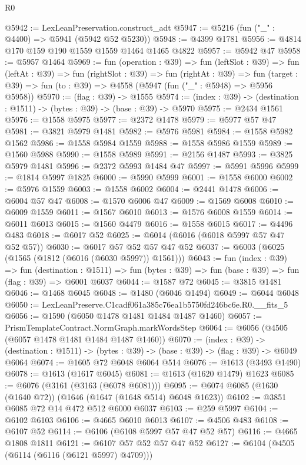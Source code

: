 \begin{lexlean}{R0}
\begin{coremodule}
@5942 := LexLeanPreservation.construct_adt
@5947 := @5216 (fun ("_" : @4400) => @5941 (@5942 @52 @5230))
@5948 := @4399 @1781
@5956 := @4814 @170 @159 @190 @1559 @1559 @1464 @1465 @4822
@5957 := @5942 @47
@5958 := @5957 @1464
@5969 := fun (operation : @39) =>
  fun (leftSlot : @39) =>
  fun (leftAt : @39) =>
  fun (rightSlot : @39) =>
  fun (rightAt : @39) =>
  fun (target : @39) => fun (to : @39) => @4558 (@5947 (fun ("_" : @5948) => @5956 @5958))
@5970 := (flag : @39) -> @1555
@5974 := (index : @39) -> (destination : @1511) -> (bytes : @39) -> (base : @39) -> @5970
@5975 := @2434 @1561
@5976 := @1558 @5975
@5977 := @2372 @1478
@5979 := @5977 @57 @47
@5981 := @3821 @5979 @1481
@5982 := @5976 @5981
@5984 := @1558 @5982 @1562
@5986 := @1558 @5984 @1559
@5988 := @1558 @5986 @1559
@5989 := @1560 @5988
@5990 := @1558 @5989
@5991 := @2156 @1487
@5993 := @3825 @5979 @1481
@5996 := @2372 @5993 @1484 @47
@5997 := @5991 @5996
@5999 := @1814 @5997 @1825
@6000 := @5990 @5999
@6001 := @1558 @6000
@6002 := @5976 @1559
@6003 := @1558 @6002
@6004 := @2441 @1478
@6006 := @6004 @57 @47
@6008 := @1570 @6006 @47
@6009 := @1569 @6008
@6010 := @6009 @1559
@6011 := @1567 @6010
@6013 := @1576 @6008 @1559
@6014 := @6011 @6013
@6015 := @1560 @4479
@6016 := @1558 @6015
@6017 := @4496 @483
@6018 := @6017 @52
@6025 := @6014 (@6016 (@6018 @5997 @57 @47 @52 @57))
@6030 := @6017 @57 @52 @57 @47 @52
@6037 := @6003 (@6025 (@1565 (@1812 (@6016 (@6030 @5997)) @1561)))
@6043 := fun (index : @39) =>
  fun (destination : @1511) =>
  fun (bytes : @39) => fun (base : @39) => fun (flag : @39) => @6001 @6037
@6044 := @1587 @72
@6045 := @3815 @1481
@6046 := @1468 @6045
@6048 := @1480 (@6046 @1494)
@6049 := @6044 @6048
@6050 := LexLeanPreserve.C1cadf061a385c76ea1b5750fd246bc6e.R0.__fits_5
@6056 := @1590 (@6050 @1478 @1481 @1484 @1487 @1460)
@6057 := PrismTemplateContract.NormGraph.markWordsStep
@6064 := @6056 (@4505 (@6057 @1478 @1481 @1484 @1487 @1460))
@6070 := (index : @39) ->
  (destination : @1511) -> (bytes : @39) -> (base : @39) -> (flag : @39) -> @6049 @6064
@6074 := @1605 @72 @6048 @6064 @514
@6076 := @1613 (@3493 @1490)
@6078 := @1613 (@1617 @6045)
@6081 := @1613 (@1620 @1479) @1623
@6085 := @6076 (@3161 (@3163 (@6078 @6081)))
@6095 := @6074 @6085 (@1630 (@1640 @72)) (@1646 (@1647 (@1648 @514) @6048 @1623))
@6102 := @3851 @6085 @72 @14 @472 @512 @6000 @6037
@6103 := @259 @5997
@6104 := @6102 @6103
@6106 := @4665 @6010 @6013
@6107 := @4506 @483
@6108 := @6107 @52
@6114 := @6106 (@6108 @5997 @57 @47 @52 @57)
@6116 := @4665 @1808 @1811
@6121 := @6107 @57 @52 @57 @47 @52
@6127 := @6104 (@4505 (@6114 (@6116 (@6121 @5997) @4709)))

\end{coremodule}
\end{lexlean}
